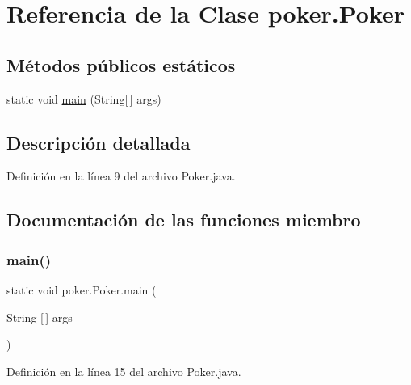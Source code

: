 \hypertarget{classpoker_1_1Poker}{}\section{Referencia de la Clase poker.\+Poker}
\label{classpoker_1_1Poker}
\subsection*{Métodos públicos estáticos}
\begin{DoxyCompactItemize}
\item 
static void \mbox{\hyperlink{classpoker_1_1Poker_ac07c479803c0f783042b79fb2999a9cb}{main}} (String\mbox{[}$\,$\mbox{]} args)
\end{DoxyCompactItemize}


\subsection{Descripción detallada}


Definición en la línea 9 del archivo Poker.\+java.



\subsection{Documentación de las funciones miembro}
\mbox{\label{classpoker_1_1Poker_ac07c479803c0f783042b79fb2999a9cb}} 
\subsubsection{\texorpdfstring{main()}{main()}}
{\footnotesize\ttfamily static void poker.\+Poker.\+main (\begin{DoxyParamCaption}\item[{String \mbox{[}$\,$\mbox{]}}]{args }\end{DoxyParamCaption})\hspace{0.3cm}{\ttfamily [static]}}



Definición en la línea 15 del archivo Poker.\+java.


